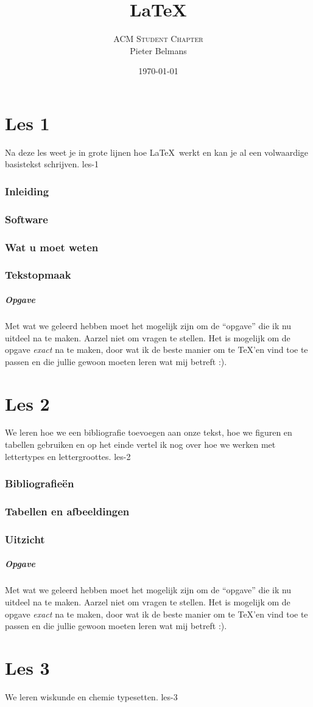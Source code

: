 \documentclass{beamer}
\title{\LaTeX}
\date{\today}
\author{\textsc{ACM Student Chapter} \\ Pieter Belmans}
\newcommand\exercise{
\begin{frame}
  \frametitle{Opgave}

  Met wat we geleerd hebben moet het mogelijk zijn om de ``opgave'' die ik nu uitdeel na te maken. Aarzel niet om vragen te stellen. Het is mogelijk om de opgave \emph{exact} na te maken, door wat ik de beste manier om te \TeX'en vind toe te passen en die jullie gewoon moeten leren wat mij betreft :).
\end{frame}
}
\begin{document}
\begin{frame}
  \titlepage
\end{frame}

\part{Les 1}
\lecture
{Na deze les weet je in grote lijnen hoe \LaTeX\ werkt en kan je al een volwaardige basistekst schrijven.}
{les-1}
\section{Inleiding}

\section{Software}

\section{Wat u moet weten}

\section{Tekstopmaak}


\exercise

\part{Les 2}
\lecture
{We leren hoe we een bibliografie toevoegen aan onze tekst, hoe we figuren en tabellen gebruiken en op het einde vertel ik nog over hoe we werken met lettertypes en lettergroottes.}
{les-2}
\section{Bibliografie\"en}

\section{Tabellen en afbeeldingen}

\section{Uitzicht}


\exercise

\part{Les 3}
\lecture
{We leren wiskunde en chemie typesetten.}
{les-3}
\end{document}
